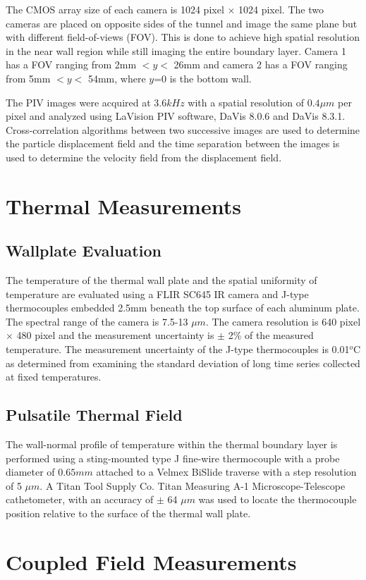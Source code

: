 The CMOS array size of each camera is 1024 pixel $\times$ 1024 pixel. The two cameras are placed on opposite sides of the tunnel and image the same plane but with different field-of-views (FOV). This is done to achieve high spatial resolution in the near wall region while still imaging the entire boundary layer. Camera 1 has a FOV ranging from 2mm $< y <$ 26mm and camera 2 has a FOV ranging from 5mm $< y <$ 54mm, where $y$=0 is the bottom wall. 

The PIV images were acquired at $3.6 kHz$ with a spatial resolution of $0.4\mu m$ per pixel and analyzed using LaVision PIV software, DaVis 8.0.6 and DaVis 8.3.1. Cross-correlation algorithms between two successive images are used to determine the particle displacement field and the time separation between the images is used to determine the velocity field from the displacement field.
 

\section{Thermal Measurements}

\subsection{Wallplate Evaluation}

The temperature of the thermal wall plate and the spatial uniformity of temperature are evaluated using a FLIR SC645 IR camera and J-type thermocouples embedded 2.5mm beneath the top surface of each aluminum plate. The spectral range of the camera is 7.5-13 $\mu m$. The camera resolution is 640 pixel $\times$ 480 pixel and the measurement uncertainty is $\pm$ 2\% of the measured temperature. The measurement uncertainty of the J-type thermocouples is 0.01$^o$C as determined from examining the standard deviation of long time series collected at fixed temperatures. 


\subsection{Pulsatile Thermal Field}

The wall-normal profile of temperature within the thermal boundary layer is performed using a sting-mounted type J fine-wire thermocouple with a probe diameter of $0.65mm$ attached to a Velmex BiSlide traverse with a step resolution of 5 $\mu m$.  A Titan Tool Supply Co. Titan Measuring A-1 Microscope-Telescope cathetometer, with an accuracy of $\pm$ 64 $\mu m$ was used to locate the thermocouple position relative to the surface of the thermal wall plate. 

\section{Coupled Field Measurements}




